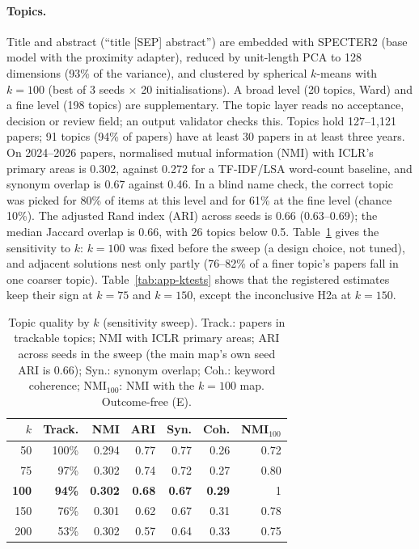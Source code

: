 \paragraph{Topics.} Title and abstract (``title [SEP] abstract'') are embedded with SPECTER2
\citep{cohan2020specter,singh2023scirepeval} (base model with the proximity adapter), reduced by unit-length PCA to
128 dimensions (93\% of the variance), and clustered by spherical $k$-means with $k=100$ (best of 3 seeds $\times$ 20
initialisations). A broad level (20 topics, Ward) and a fine level (198 topics) are supplementary. The topic layer
reads no acceptance, decision or review field; an output validator checks this. Topics hold 127--1,121 papers; 91
topics (94\% of papers) have at least 30 papers in at least three years. On 2024--2026 papers, normalised mutual
information (NMI) with ICLR's primary areas is 0.302, against 0.272 for a TF-IDF/LSA word-count baseline, and
synonym overlap is 0.67 against 0.46. In a blind name check, the correct topic was picked for 80\% of items at this
level and for 61\% at the fine level (chance 10\%). The adjusted Rand index (ARI) across seeds is 0.66 (0.63--0.69);
the median Jaccard overlap is 0.66, with 26 topics below 0.5. Table~\ref{tab:app-k} gives the sensitivity to $k$:
$k=100$ was fixed before the sweep (a design choice, not tuned), and adjacent solutions nest only partly (76--82\% of a
finer topic's papers fall in one coarser topic). Table~\ref{tab:app-ktests} shows that the registered estimates keep
their sign at $k=75$ and $k=150$, except the inconclusive H2a at $k=150$.

\begin{table}[t]
\centering\footnotesize
\setlength{\tabcolsep}{3.5pt}
\begin{tabular}{@{}rrrrrrr@{}}
\toprule
$k$ & Track. & NMI & ARI & Syn. & Coh. & NMI$_{100}$ \\
\midrule
50 & 100\% & 0.294 & 0.77 & 0.77 & 0.26 & 0.72 \\
75 & 97\% & 0.302 & 0.74 & 0.72 & 0.27 & 0.80 \\
\textbf{100} & \textbf{94\%} & \textbf{0.302} & \textbf{0.68} & \textbf{0.67} & \textbf{0.29} & 1 \\
150 & 76\% & 0.301 & 0.62 & 0.67 & 0.31 & 0.78 \\
200 & 53\% & 0.302 & 0.57 & 0.64 & 0.33 & 0.75 \\
\bottomrule
\end{tabular}
\caption{Topic quality by $k$ (sensitivity sweep). Track.: papers in trackable topics; NMI with ICLR primary areas;
ARI across seeds in the sweep (the main map's own seed ARI is 0.66); Syn.: synonym overlap; Coh.: keyword coherence;
NMI$_{100}$: NMI with the $k=100$ map. Outcome-free (E).}
\label{tab:app-k}
\end{table}

